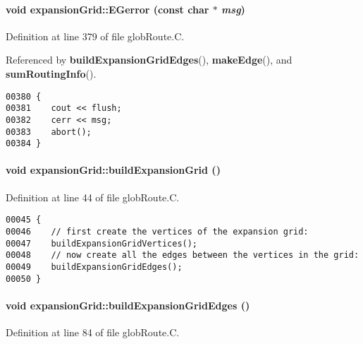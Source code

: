 \paragraph{\setlength{\rightskip}{0pt plus 5cm}void expansion\-Grid::EGerror (const char $\ast$ {\em msg})\hspace{0.3cm}{\tt  [private]}}\hfill



Definition at line 379 of file glob\-Route.C.

Referenced by {\bf build\-Expansion\-Grid\-Edges}(), {\bf make\-Edge}(), and {\bf sum\-Routing\-Info}().\small\begin{verbatim}00380 {
00381    cout << flush;
00382    cerr << msg;
00383    abort();
00384 }
\end{verbatim}\normalsize 
\label{expansionGrid_c0}
\paragraph{\setlength{\rightskip}{0pt plus 5cm}void expansion\-Grid::build\-Expansion\-Grid ()\hspace{0.3cm}{\tt  [private]}}\hfill



Definition at line 44 of file glob\-Route.C.\small\begin{verbatim}00045 {
00046    // first create the vertices of the expansion grid:
00047    buildExpansionGridVertices();
00048    // now create all the edges between the vertices in the grid:
00049    buildExpansionGridEdges();
00050 }
\end{verbatim}\normalsize 
\label{expansionGrid_c2}
\paragraph{\setlength{\rightskip}{0pt plus 5cm}void expansion\-Grid::build\-Expansion\-Grid\-Edges ()\hspace{0.3cm}{\tt  [private]}}\hfill



Definition at line 84 of file glob\-Route.C.

